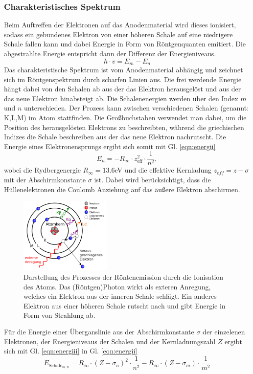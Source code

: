 \subsubsection*{Charakteristisches Spektrum}
Beim Auftreffen der Elektronen auf das Anodenmaterial wird dieses ionisiert, sodass
ein gebundenes Elektron von einer höheren Schale auf eine niedrigere Schale fallen kann und dabei
Energie in Form von Röntgenquanten emitiert. Die abgestrahlte Energie entspricht dann der Differenz
der Energieniveaus.
\begin{equation}
    h\cdot v=E_m-E_n
    \label{eqn:energii}
\end{equation}
Das charakteristische Spektrum ist vom Anodenmaterial abhängig und zeichnet sich im
Röntgenspektrum durch scharfen Linien aus.
Die frei werdende Energie hängt dabei von den Schalen ab aus der das Elektron herausgelöst
und aus der das neue Elektron hinabsteigt ab. Die Schalenenergien werden über den Index $m$ und $n$
unterschieden. Der Prozess kann zwischen verschiedenen Schalen (genannt: K,L,M) im Atom 
stattfinden. Die Großbuchstaben verwendet man dabei, um die Position des herausgelösten Elektrons zu 
beschreibten, während die griechischen Indizes die Schale beschreiben aus der das neue Elektron 
nachrutscht.
Die Energie eines Elektronensprungs ergibt sich somit mit Gl. \ref{eqn:energii}
\begin{equation}
    E_n=-R_{\infty}\cdot z_{\text{eff}}^2 \cdot \frac{1}{n^2},
    \label{eqn:energiii}
\end{equation}
wobei die Rydbergenergie $R_{\infty}=13.6$eV und die effektive Kernladung 
$z_{eff}=z-\sigma$ mit der Abschirmkonstante $\sigma$ ist. Dabei wird berücksichtigt,
dass die Hüllenelektronen die Coulomb Anziehung auf das äußere Elektron abschirmen.
\begin{figure}
    \centering
    \includegraphics[width=0.4\textwidth]{plots/chS.png}
    \caption{Darstellung des Prozesses der Röntenemission durch die
    Ionisation des Atoms. Das (Röntgen)Photon wirkt als exteren Anregung, welches
    ein Elektron aus der inneren Schale schlägt. Ein anderes Elektron aus einer
    höheren Schale rutscht nach und gibt Energie in Form von Strahlung ab.\cite{wiki}}
\end{figure}
Für die Energie einer Überganslinie aus der Abschirmkonstante $\sigma$ der einzelenen Elektronen, der Energieniveaus
der Schalen und der Kernladnungszahl $Z$ ergibt sich mit Gl. \ref{eqn:energiii} in Gl. \ref{eqn:energii}
\begin{equation}
    E_{\text{Schale}_{m,n}}=R_{\infty}\cdot (Z-\sigma_n)^2\cdot \frac{1}{n^2}-R_{\infty}\cdot (Z-\sigma_m)\cdot \frac{1}{m^2}
\end{equation}
